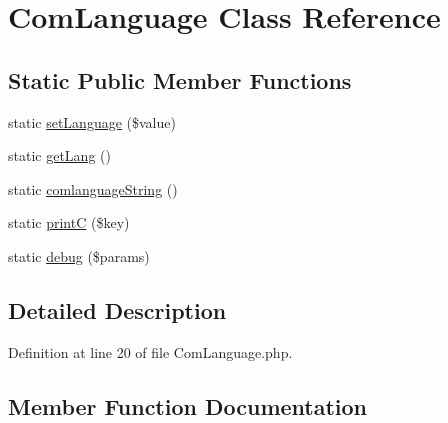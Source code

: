 \hypertarget{class_zest_1_1_component_1_1_language_1_1_com_language}{}\section{Com\+Language Class Reference}
\label{class_zest_1_1_component_1_1_language_1_1_com_language}
\subsection*{Static Public Member Functions}
\begin{DoxyCompactItemize}
\item 
static \mbox{\hyperlink{class_zest_1_1_component_1_1_language_1_1_com_language_ac8a46cd0f5e5c850c5ea9b79d481de1f}{set\+Language}} (\$value)
\item 
static \mbox{\hyperlink{class_zest_1_1_component_1_1_language_1_1_com_language_a077fea27c088bf2ea25704aab2f715dd}{get\+Lang}} ()
\item 
static \mbox{\hyperlink{class_zest_1_1_component_1_1_language_1_1_com_language_ad2b58bb11a0c4a0daf630ccedf96e151}{comlanguage\+String}} ()
\item 
static \mbox{\hyperlink{class_zest_1_1_component_1_1_language_1_1_com_language_a5af89c48a67122427465bcb68395d5d9}{printC}} (\$key)
\item 
static \mbox{\hyperlink{class_zest_1_1_component_1_1_language_1_1_com_language_a39f92ff73a1a732560a5efcdaa755f0c}{debug}} (\$params)
\end{DoxyCompactItemize}


\subsection{Detailed Description}


Definition at line 20 of file Com\+Language.\+php.



\subsection{Member Function Documentation}
\mbox{\label{class_zest_1_1_component_1_1_language_1_1_com_language_ad2b58bb11a0c4a0daf630ccedf96e151}} 
